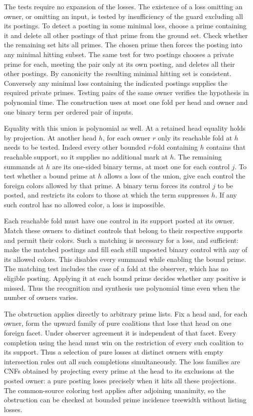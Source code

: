 The tests require no expansion of the losses.
The existence of a loss omitting an owner, or
omitting an input, is tested by insufficiency of
the guard excluding all its postings. To detect
a posting in some minimal loss, choose a prime
containing it and delete all other postings of
that prime from the ground set. Check whether the
remaining set hits all primes. The chosen prime
then forces the posting into any minimal hitting
subset. The same test for two postings chooses
a private prime for each, meeting the pair only
at its own posting, and deletes all their other
postings. By canonicity the resulting minimal
hitting set is consistent. Conversely any minimal
loss containing the indicated postings supplies
the required private primes. Testing pairs of
the same owner verifies the hypothesis in polynomial
time. The construction uses at most one fold
per head and owner and one binary term per ordered
pair of inputs.

Equality with this union is polynomial as well.
At a retained head equality holds by projection.
At another head $h$, for each owner $r$ only its
reachable fold at $h$ needs to be tested. Indeed
every other bounded $r$-fold containing $h$ contains
that reachable support, so it supplies no additional
mark at $h$. The remaining summands at $h$ are its
one-sided binary terms, at most one for each control
$j$. To test whether a bound prime at $h$ allows
a loss of the union, give each control the foreign
colors allowed by that prime. A binary term forces
its control $j$ to be posted, and restricts its
colors to those at which the term suppresses $h$.
If any such control has no allowed color, a loss
is impossible.

Each reachable fold must have one control in its
support posted at its owner. Match these owners
to distinct controls that belong to their respective
supports and permit their colors. Such a matching
is necessary for a loss, and sufficient: make the
matched postings and fill each still unposted
binary control with any of its allowed colors.
This disables every summand while enabling the
bound prime. The matching test includes the case
of a fold at the observer, which has no eligible
posting. Applying it at each bound prime decides
whether any positive is missed. Thus the
recognition and synthesis use polynomial time
even when the number of owners varies.

The obstruction applies directly to arbitrary prime
lists. Fix a head and, for each owner, form the upward
family of pure coalitions that lose that head on one
foreign facet. Under observer agreement it is
independent of that facet. Every completion using
the head must win on the restriction of every such
coalition to its support. Thus a selection of pure
losses at distinct owners with empty intersection
rules out all such completions simultaneously.
The loss families are CNFs obtained by projecting
every prime at the head to its exclusions at the
posted owner: a pure posting loses precisely when
it hits all these projections. The common-source
coloring test applies after adjoining unanimity,
so the obstruction can be checked at bounded
prime incidence treewidth without listing losses.

